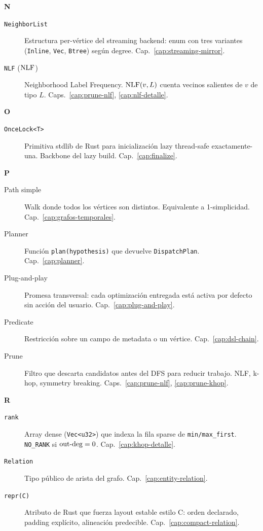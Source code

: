 \noindent
\textbf{N}

\begin{description}
    \item[\texttt{NeighborList}] Estructura per-vértice del
    streaming backend: enum con tres variantes
    (\texttt{Inline}, \texttt{Vec}, \texttt{Btree}) según degree.
    Cap.~\ref{cap:streaming-mirror}.

    \item[\texttt{NLF} (\(\mathrm{NLF}\))] Neighborhood Label Frequency.
    \(\mathrm{NLF}(v, L)\) cuenta vecinos salientes de \(v\) de tipo \(L\).
    Caps.~\ref{cap:prune-nlf}, \ref{cap:nlf-detalle}.
\end{description}

\noindent
\textbf{O}

\begin{description}
    \item[\texttt{OnceLock<T>}] Primitiva stdlib de Rust para
    inicialización lazy thread-safe exactamente-una. Backbone del
    lazy build. Cap.~\ref{cap:finalize}.
\end{description}

\noindent
\textbf{P}

\begin{description}
    \item[Path simple] Walk donde todos los vértices son distintos.
    Equivalente a 1-simplicidad. Cap.~\ref{cap:grafos-temporales}.

    \item[Planner] Función \texttt{plan(hypothesis)} que devuelve
    \texttt{DispatchPlan}. Cap.~\ref{cap:planner}.

    \item[Plug-and-play] Promesa transversal: cada optimización
    entregada está activa por defecto sin acción del usuario.
    Cap.~\ref{cap:plug-and-play}.

    \item[Predicate] Restricción sobre un campo de metadata o un
    vértice. Cap.~\ref{cap:dsl-chain}.

    \item[Prune] Filtro que descarta candidatos antes del DFS para
    reducir trabajo. NLF, k-hop, symmetry breaking.
    Caps.~\ref{cap:prune-nlf}, \ref{cap:prune-khop}.
\end{description}

\noindent
\textbf{R}

\begin{description}
    \item[\texttt{rank}] Array dense (\texttt{Vec<u32>}) que
    indexa la fila sparse de \texttt{min/max\_first}.
    \texttt{NO\_RANK} si \(\mathrm{out\text{-}deg} = 0\).
    Cap.~\ref{cap:khop-detalle}.

    \item[\texttt{Relation}] Tipo público de arista del grafo.
    Cap.~\ref{cap:entity-relation}.

    \item[\texttt{repr(C)}] Atributo de Rust que fuerza layout
    estable estilo C: orden declarado, padding explícito,
    alineación predecible. Cap.~\ref{cap:compact-relation}.
\end{description}

